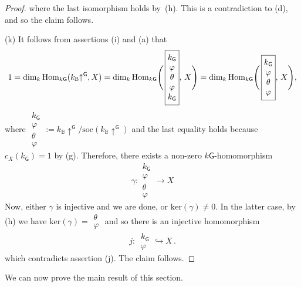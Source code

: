 \documentclass[12pt,a4paper]{amsart}
\theoremstyle{plain}\newtheorem{Theorem}{Theorem}[section]
\theoremstyle{plain}\newtheorem{Conjecture}[Theorem]{Conjecture}
\theoremstyle{plain}\newtheorem{Corollary}[Theorem]{Corollary}
\theoremstyle{plain}\newtheorem{Lemma}[Theorem]{Lemma}
\theoremstyle{plain}\newtheorem{Proposition}[Theorem]{Proposition}
\theoremstyle{definition}\newtheorem{Definition}[Theorem]{Definition}
\theoremstyle{definition}\newtheorem{Example}[Theorem]{Example}
\theoremstyle{definition}\newtheorem{Examples}[Theorem]{Examples}
\theoremstyle{definition}\newtheorem{Remark}[Theorem]{Remark}
\theoremstyle{definition}\newtheorem{Question}[Theorem]{Question}
\theoremstyle{definition}\newtheorem{Notation}[Theorem]{Notation}
\theoremstyle{definition}\newtheorem{Hypothesis}[Theorem]{Hypothesis}
\theoremstyle{definition}\newtheorem{Assumption}[Theorem]{Assumption}
\theoremstyle{definition}\newtheorem{Strategy}[Theorem]{Strategy}
\theoremstyle{definition}\newtheorem{Contents}[Theorem]{Contents}
\theoremstyle{definition}\newtheorem{Computations}[Theorem]{Computations}
\theoremstyle{definition}\newtheorem{Equivalences}[Theorem]{Equivalences}
\theoremstyle{definition}\newtheorem{Notation/Definition}[Theorem]{Notation/Definition}
\theoremstyle{definition}\newtheorem{noth}[Theorem]{}
\theoremstyle{plain}\newtheorem{Step}[Theorem]{Step}
\def\dim{\mathrm{dim}}
\def\ker{\mathrm{ker}} \def\tenkT{\otimes_{kT}} \def\Id{\mathrm{Id}}
\def\soc{\mathrm{soc}} \def\tenOS{\otimes_{\mathcal{O}S}} \def\Tr{\mathrm{Tr}}
\begin{document}
\begin{proof}
where the last isomorphism holds  by~(h). This is a contradiction to (d), 
and so the \smallskip claim follows. 
\par
(k)
It follows from assertions (i) and (a) that 
$$
1 = \dim_k\,\Hom_{k\mathsf{G}}(k_{\mathbb B}{\uparrow}^\mathsf{G},X) 
=
\dim_k\,\Hom_{k\mathsf{G}}\Biggl(\, \boxed{\begin{matrix}
k_\mathsf{G}\\ \varphi\\ \theta\\ \varphi\\k_\mathsf{G}
\end{matrix}},\,X\Biggr) 
=\dim_k\,\Hom_{k\mathsf{G}}\Biggl( \,
\boxed{\begin{matrix}
k_\mathsf{G}\\ \varphi\\ \theta\\ \varphi
\end{matrix}},\,X\Biggr),
$$
where $\boxed{\begin{matrix}
k_\mathsf{G}\\ \varphi\\ \theta\\ \varphi
\end{matrix}}:= k_{\mathbb B}{\uparrow}^\mathsf{G} /\soc(k_{\mathbb B}{\uparrow}^\mathsf{G})$ and the
 last equality holds because $c_X(k_\mathsf{G})=1$ by (g).  Therefore, there exists a non-zero 
 $k\mathsf{G}$-homomorphism 
 $$\gamma: \boxed{\begin{matrix}
k_\mathsf{G}\\ \varphi\\ \theta\\ \varphi
\end{matrix}} \longrightarrow X
 $$ 
Now,  either $\gamma$ is injective and we are done, or $\ker(\gamma)\neq 0$. 
In the latter case, by (h) we have  $\ker(\gamma)= \boxed{\begin{matrix}
 \theta\\ \varphi
\end{matrix}}$
and so there is an injective homomorphism
$$j:\, \boxed{\begin{matrix}
 k_{\mathsf{G}}\\ \varphi
\end{matrix}}\hookrightarrow X\,.$$
which contradicts assertion (j). The claim follows. 
\end{proof}


We can now prove the main result of this section.\\
\end{document}

